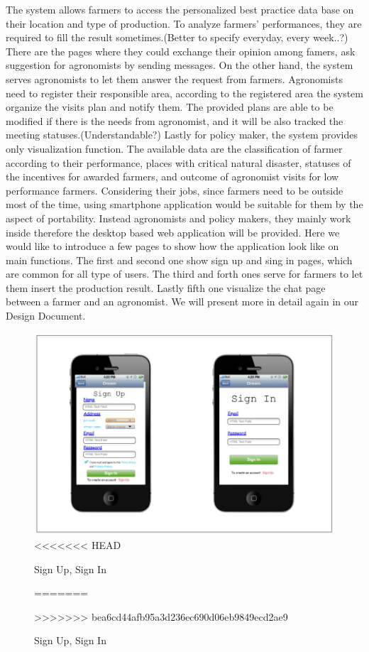 The system allows farmers to access the personalized best practice data base on their location and type of production. To analyze farmers' performances, they are required to fill the result sometimes.(Better to specify everyday, every week..?) There are the pages where they could exchange their opinion among famers, ask suggestion for agronomists by sending messages. 
\newline
On the other hand, the system serves agronomists to let them answer the request from farmers. 
Agronomists need to register their responsible area, according to the registered area the system organize the visits plan and notify them. The provided plans are able to be modified if there is the needs from agronomist, and it will be also tracked the meeting statuses.(Understandable?)
\newline
Lastly for policy maker, the system provides only visualization function. The available data are the
classification of farmer according to their performance, places with critical natural disaster, statuses of the incentives for awarded farmers, and outcome of agronomist visits for low performance farmers. Considering their jobs, since farmers need to be outside most of the time, using smartphone application would be suitable for them by the aspect of portability. Instead agronomists and policy makers, they mainly work inside therefore the desktop based web application will be provided. 
\newline
\newline
Here we would like to introduce a few pages to show how the application look like on main functions. The first and second one show sign up and sing in pages, which are common for all type of users. The third and forth ones serve for farmers to let them insert the production result. Lastly fifth one visualize the chat page between a farmer and an agronomist. We will present more in detail again in our Design Document. 

\begin{figure}[H]
	\centering
    \includegraphics[page=1, width=\textwidth]{Images/sign_up_in.JPG}
<<<<<<< HEAD
	\caption{\label{fig:FE_image1}Sign Up, Sign In}
=======
	\caption{\label{fig:FE_image}Sign Up, Sign In}
>>>>>>> bea6cd44afb95a3d236ec690d06eb9849ecd2ae9
\end{figure}

